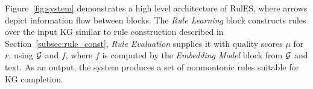 Figure~\ref{fig:system} demonstrates a high level architecture of RulES, where arrows depict information flow between blocks.
The \emph{Rule Learning} block constructs rules over the input KG similar to rule construction described in Section~\ref{subsec:rule_const}, \emph{Rule Evaluation} supplies it with quality scores $\mu$ for $r$, using $\mathcal{G}$ and $f$, where $f$ is computed by the \emph{Embedding Model} block from $\mathcal{G}$ and text. As an output, the system produces a set of nonmontonic rules suitable for KG completion.



 

